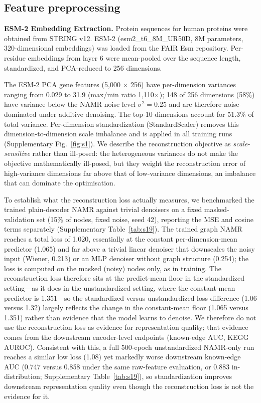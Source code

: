 \documentclass[11pt,a4paper]{article}
\newcommand{\supptab}[1]{Supplementary Table~\ref{#1}}
\newcommand{\suppfig}[1]{Supplementary Fig.~\ref{#1}}
\begin{document}
\subsection{Feature preprocessing}

\textbf{ESM-2 Embedding Extraction.} Protein sequences for human proteins were obtained from STRING v12. ESM-2 (esm2\_t6\_8M\_UR50D, 8M parameters, 320-dimensional embeddings) was loaded from the FAIR Esm repository. Per-residue embeddings from layer 6 were mean-pooled over the sequence length, standardized, and PCA-reduced to 256 dimensions.

The ESM-2 PCA gene features (5,000 $\times$ 256) have per-dimension variances ranging from 0.029 to 31.9 (max/min ratio 1,110$\times$); 148 of 256 dimensions (58\%) have variance below the NAMR noise level $\sigma^2 = 0.25$ and are therefore noise-dominated under additive denoising. The top-10 dimensions account for 51.3\% of total variance. Per-dimension standardization (StandardScaler) removes this dimension-to-dimension scale imbalance and is applied in all training runs (\suppfig{fig:s1}). We describe the reconstruction objective as \textit{scale-sensitive} rather than ill-posed: the heterogeneous variances do not make the objective mathematically ill-posed, but they weight the reconstruction error of high-variance dimensions far above that of low-variance dimensions, an imbalance that can dominate the optimisation.

 To establish what the reconstruction loss actually measures, we benchmarked the trained plain-decoder NAMR against trivial denoisers on a fixed masked-validation set (15\% of nodes, fixed noise, seed 42), reporting the MSE and cosine terms separately (\supptab{tab:s19}). The trained graph NAMR reaches a total loss of 1.020, essentially at the constant per-dimension-mean predictor (1.065) and far above a trivial linear denoiser that downscales the noisy input (Wiener, 0.213) or an MLP denoiser without graph structure (0.254); the loss is computed on the masked (noisy) nodes only, as in training. The reconstruction loss therefore sits at the predict-mean floor in the standardized setting---as it does in the unstandardized setting, where the constant-mean predictor is 1.351---so the standardized-versus-unstandardized loss difference (1.06 versus 1.32) largely reflects the change in the constant-mean floor (1.065 versus 1.351) rather than evidence that the model learns to denoise. We therefore do not use the reconstruction loss as evidence for representation quality; that evidence comes from the downstream encoder-level endpoints (known-edge AUC, KEGG AUROC). Consistent with this, a full 500-epoch unstandardized NAMR-only run reaches a similar low loss (1.08) yet markedly worse downstream known-edge AUC (0.747 versus 0.858 under the same raw-feature evaluation, or 0.883 in-distribution; \supptab{tab:s19}), so standardization improves downstream representation quality even though the reconstruction loss is not the evidence for it.
\end{document}
